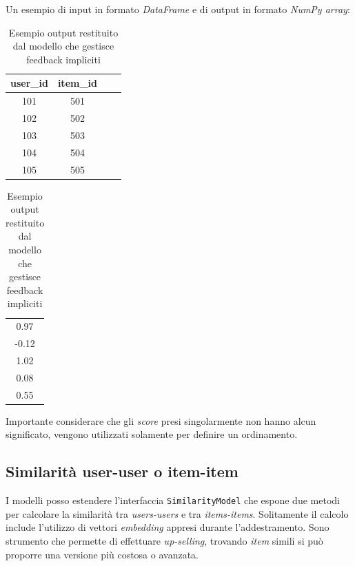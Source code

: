 Un esempio di input in formato \textit{DataFrame} e di output in formato \textit{NumPy array}:

\begin{table}[H]
    \centering
    \begin{minipage}{0.6\textwidth}
        \centering
        \begin{tabular}{|c|c|c|c|}
        \hline
        \textbf{user\_id} & \textbf{item\_id} \\
        \hline
            101 & 501 \\
            102 & 502 \\
            103 & 503 \\
            104 & 504 \\
            105 & 505 \\
        \hline
        \end{tabular}
    \end{minipage}%
    \hfill
    \begin{minipage}{0.3\textwidth}
        \centering
        \begin{tabular}{|c|}
        \hline
        0.97 \\
        -0.12 \\
        1.02 \\
        0.08 \\
        0.55 \\
        \hline
        \end{tabular}
    \end{minipage}
    \caption{Esempio output restituito dal modello che gestisce feedback impliciti}
    \label{tab:ratings_with_score}
\end{table}

Importante considerare che gli \textit{score} presi singolarmente non hanno alcun significato, vengono utilizzati solamente per definire un ordinamento.

\subsection{Similarità user-user o item-item}

I modelli posso estendere l'interfaccia \texttt{SimilarityModel} che espone due metodi per calcolare la similarità tra \textit{users-users} e tra \textit{items-items}. Solitamente il calcolo include l'utilizzo di vettori \textit{embedding} appresi durante l'addestramento. Sono strumento che permette di effettuare \textit{up-selling}, trovando \textit{item} simili si può proporre una versione più costosa o avanzata.

